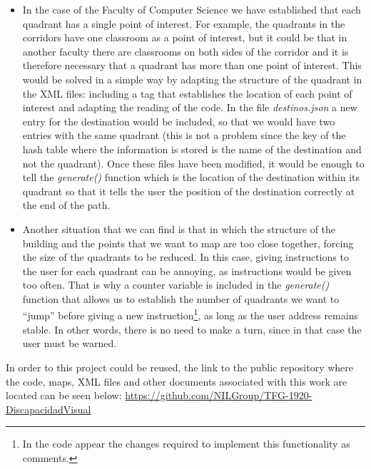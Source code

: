 \begin{itemize}
		
	\item In the case of the Faculty of Computer Science we have established that each quadrant has a single point of interest. For example, the quadrants in the corridors have one classroom as a point of interest, but it could be that in another faculty there are classrooms on both sides of the corridor and it is therefore necessary that a quadrant has more than one point of interest. This would be solved in a simple way by adapting the structure of the quadrant in the XML files: including a tag that establishes the location of each point of interest and adapting the reading of the code. In the file \textit{destinos.json} a new entry for the destination would be included, so that we would have two entries with the same quadrant (this is not a problem since the key of the hash table where the information is stored is the name of the destination and not the quadrant). Once these files have been modified, it would be enough to tell the \textit{generate()} function which is the location of the destination within its quadrant so that it tells the user the position of the destination correctly at the end of the path.
		
	\item Another situation that we can find is that in which the structure of the building and the points that we want to map are too close together, forcing the size of the quadrants to be reduced. In this case, giving instructions to the user for each quadrant can be annoying, as instructions would be given too often. That is why a counter variable is included in the \textit{generate()} function that allows us to establish the number of quadrants we want to ``jump'' before giving a new instruction\footnote{In the code appear the changes required to implement this functionality as comments.}, as long as the user address remains stable. In other words, there is no need to make a turn, since in that case the user must be warned.  
		
\end{itemize}
	
In order to this project could be reused, the link to the public repository where the code, maps, XML files and other documents associated with this work are located can be seen below: \url{https://github.com/NILGroup/TFG-1920-DiscapacidadVisual}
	




